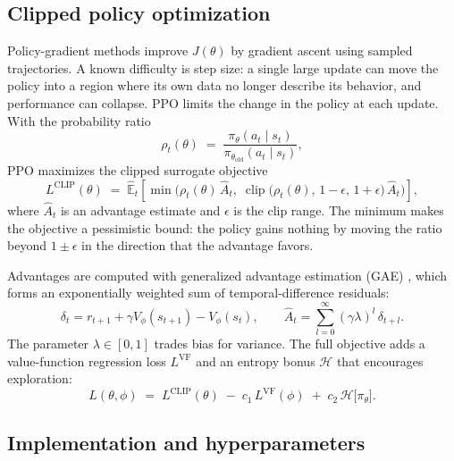 \documentclass[11pt,a4paper]{article}
\newcommand{\E}{\mathbb{E}}
\newcommand{\clip}{\operatorname{clip}}
\begin{document}
\subsection{Clipped policy optimization}

Policy-gradient methods improve $J(\theta)$ by gradient ascent using sampled trajectories. A known difficulty is step size: a single large update can move the policy into a region where its own data no longer describe its behavior, and performance can collapse. PPO \cite{schulman2017} limits the change in the policy at each update. With the probability ratio
\begin{equation}
  \rho_t(\theta) \;=\; \frac{\pi_\theta(a_t\mid s_t)}{\pi_{\theta_{\text{old}}}(a_t\mid s_t)}, \label{eq:ratio}
\end{equation}
PPO maximizes the clipped surrogate objective
\begin{equation}
  L^{\text{CLIP}}(\theta) \;=\; \hat{\E}_t\!\left[\min\!\Big(\rho_t(\theta)\,\hat A_t,\; \clip\big(\rho_t(\theta),\,1-\epsilon,\,1+\epsilon\big)\,\hat A_t\Big)\right], \label{eq:clip}
\end{equation}
where $\hat A_t$ is an advantage estimate and $\epsilon$ is the clip range. The minimum makes the objective a pessimistic bound: the policy gains nothing by moving the ratio beyond $1\pm\epsilon$ in the direction that the advantage favors.

Advantages are computed with generalized advantage estimation (GAE) \cite{schulman2016}, which forms an exponentially weighted sum of temporal-difference residuals:
\begin{equation}
  \delta_t = r_{t+1} + \gamma V_\phi(s_{t+1}) - V_\phi(s_t), \qquad
  \hat A_t = \sum_{l=0}^{\infty} (\gamma\lambda)^{l}\, \delta_{t+l}. \label{eq:gae}
\end{equation}
The parameter $\lambda\in[0,1]$ trades bias for variance. The full objective adds a value-function regression loss $L^{\text{VF}}$ and an entropy bonus $\mathcal{H}$ that encourages exploration:
\begin{equation}
  L(\theta,\phi) \;=\; L^{\text{CLIP}}(\theta) \;-\; c_1\,L^{\text{VF}}(\phi) \;+\; c_2\,\mathcal{H}\big[\pi_\theta\big]. \label{eq:ppoloss}
\end{equation}

\subsection{Implementation and hyperparameters}
\end{document}
